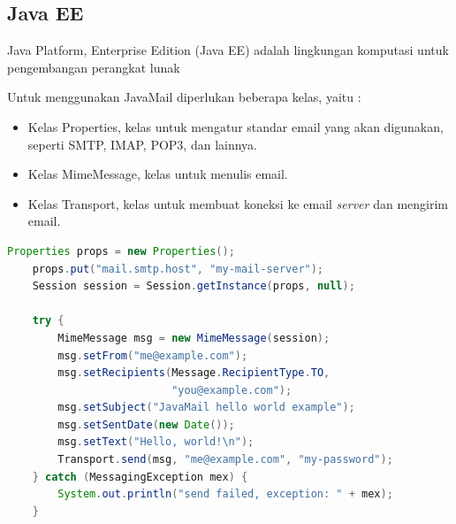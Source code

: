 \subsection{Java EE}
Java Platform, Enterprise Edition (Java EE) adalah lingkungan komputasi untuk pengembangan perangkat lunak 


Untuk menggunakan JavaMail diperlukan beberapa kelas, yaitu :
\begin{itemize}
	\item Kelas Properties, kelas untuk mengatur standar email yang akan digunakan, seperti SMTP, IMAP, POP3, dan lainnya.
	\item Kelas MimeMessage, kelas untuk menulis email.
	\item Kelas Transport, kelas untuk membuat koneksi ke email \textit{server} dan mengirim email.
\end{itemize}

\begin{lstlisting}[language=Java,basicstyle=\tiny,caption=Contoh Kode Pengiriman Email]
Properties props = new Properties();
    props.put("mail.smtp.host", "my-mail-server");
    Session session = Session.getInstance(props, null);

    try {
        MimeMessage msg = new MimeMessage(session);
        msg.setFrom("me@example.com");
        msg.setRecipients(Message.RecipientType.TO,
                          "you@example.com");
        msg.setSubject("JavaMail hello world example");
        msg.setSentDate(new Date());
        msg.setText("Hello, world!\n");
        Transport.send(msg, "me@example.com", "my-password");
    } catch (MessagingException mex) {
        System.out.println("send failed, exception: " + mex);
    }
		
\end{lstlisting}


